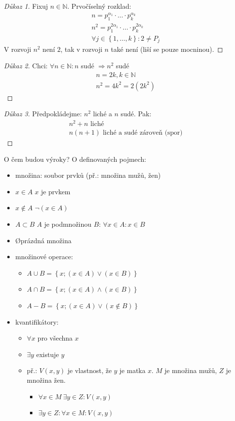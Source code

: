 \begin{proof}[Důkaz 1]
	Fixuj $n\in \mathbb{N}$. Prvočíselný rozklad:
	\begin{gather}
		n = p_1^{\alpha_1} \cdot \ldots \cdot p_k^{\alpha_k} \\
		n^2 = p_1^{2\alpha_1} \cdot \ldots \cdot p_k^{2\alpha_k} \\
		\forall j \in \left\{1,\ldots,k\right\}: 2 \neq P_j
	\end{gather}
	V rozvoji $n^2$ není $2$, tak v rozvoji $n$ také není (liší se pouze mocninou).
\end{proof}
\begin{proof}[Důkaz 2]
	Chci: $\forall n \in \mathbb{N}: n$ sudé $\Rightarrow n^2$ sudé
	\begin{gather}
		n = 2k, k\in\mathbb{N} \\
		n^2 = 4k^2 = 2(2k^2)
	\end{gather}
\end{proof}
\begin{proof}[Důkaz 3]
	Předpokládejme: $n^2$ liché a $n$ sudé. Pak:
	\begin{gather}
		n^2 + n \text{ liché}  \\
		n(n + 1) \text{ liché a sudé zároveň (spor)}
	\end{gather}  
\end{proof}
O čem budou výroky? O definovaných pojmech:
\begin{itemize}
	\item množina: soubor prvků (př.: množina mužů, žen)
	\item $x\in A$ \quad $x$ je prvkem
	\item $x\notin A$ \quad $\lnot (x\in A)$
	\item $A\subset B$ \quad $A$ je podmnožinou $B$: $\forall x \in A: x \in B$
	\item \O \quad prázdná množina
	\item množinové operace:
	\begin{itemize}
		\item $A\cup B = \left\{x; (x\in A)\lor(x\in B)\right\}$
		\item $A\cap B = \left\{x; (x\in A)\land(x\in B)\right\}$
		\item $A - B = \left\{x; (x\in A)\lor(x\notin B)\right\}$
	\end{itemize}
	\item kvantifikátory:
	\begin{itemize}
		\item $\forall x$ \quad pro všechna $x$
		\item $\exists y$ \quad existuje $y$
		\item př.: $V(x,y)$ je vlastnost, že $y$ je matka $x$. $M$ je množina
			mužů, $Z$ je množina žen.
		\begin{itemize}
			\item $\forall x \in M~\exists y \in Z: V(x,y)$
			\item $\exists y \in Z: \forall x \in M: V(x,y)$
		\end{itemize}
	\end{itemize}
\end{itemize}

